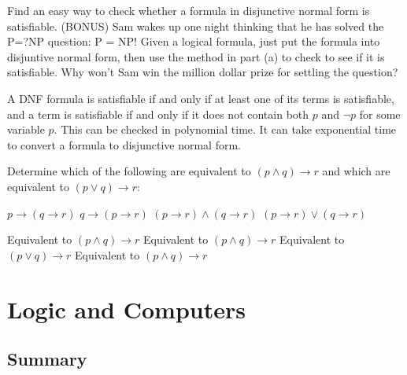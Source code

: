 \documentclass[solution, letterpaper]{cs20}
\begin{document}

        \subproblem Find an easy way to check whether a formula in disjunctive normal form is satisfiable.
        \subproblem (BONUS) Sam wakes up one night thinking that he has solved the P=?NP question:  P = NP!  Given a logical formula, just put the formula into disjuntive normal form, then use the method in part (a) to check to see if it is satisfiable. Why won't Sam win the million dollar prize for settling the question?

        \begin{solution}
        \subsolution A DNF formula is satisfiable if and only if at least one of its terms is satisfiable, and a term is satisfiable if and only if it does not contain both $p$ and $\lnot p$ for some variable $p$. This can be checked in polynomial time.
        \subsolution It can take exponential time to convert a formula to disjunctive normal form.
        \end{solution}


        Determine which of the following are equivalent to $(p \land q) \rightarrow r$ and which are equivalent to $(p \lor q) \rightarrow r$:

        \subproblem $p \rightarrow (q \rightarrow r)$
        \subproblem $q \rightarrow (p \rightarrow r)$
        \subproblem $(p \rightarrow r) \land (q \rightarrow r)$
        \subproblem $(p \rightarrow r) \lor (q \rightarrow r)$

        \begin{solution}
        \subsolution Equivalent to $(p \land q) \rightarrow r$
        \subsolution Equivalent to $(p \land q) \rightarrow r$
        \subsolution Equivalent to $(p \lor q) \rightarrow r$
        \subsolution Equivalent to $(p \land q) \rightarrow r$
        \end{solution}

	\section{Logic and Computers}
	    \subsection{Summary}
\end{document}
